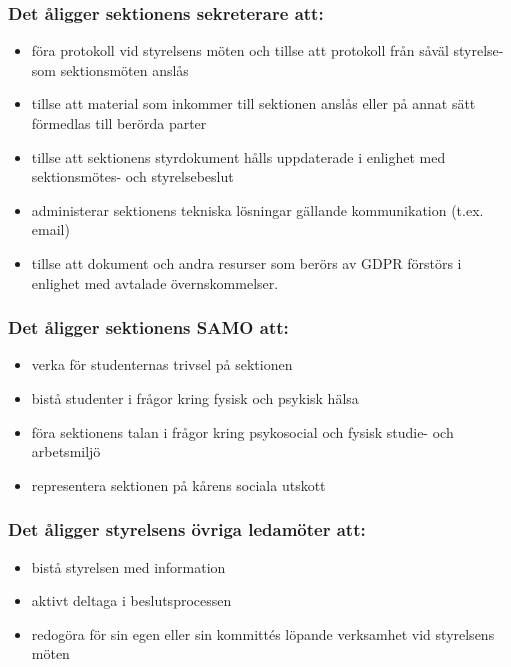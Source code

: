 \subsubsection{Det åligger sektionens sekreterare att:}

\begin{itemize}
  \item föra protokoll vid styrelsens möten och tillse att protokoll från såväl styrelse- som sektionsmöten anslås
  \item tillse att material som inkommer till sektionen anslås eller på annat sätt förmedlas till berörda parter
  \item tillse att sektionens styrdokument hålls uppdaterade i enlighet med sektionsmötes- och styrelsebeslut
  \item administerar sektionens tekniska lösningar gällande kommunikation (t.ex. email)
  \item tillse att dokument och andra resurser som berörs av GDPR förstörs i enlighet med avtalade övernskommelser.
\end{itemize}

\subsubsection{Det åligger sektionens SAMO att:}

\begin{itemize}
    \item verka för studenternas trivsel på sektionen
    \item bistå studenter i frågor kring fysisk och psykisk hälsa
    \item föra sektionens talan i frågor kring psykosocial och fysisk studie- och arbetsmiljö
    \item representera sektionen på kårens sociala utskott
\end{itemize}

\subsubsection{Det åligger styrelsens övriga ledamöter att:}

\begin{itemize}
  \item bistå styrelsen med information 
  \item aktivt deltaga i beslutsprocessen 
  \item redogöra för sin egen eller sin kommittés löpande verksamhet vid styrelsens möten 
\end{itemize}

